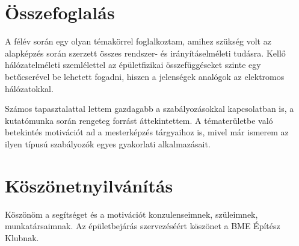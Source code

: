 \chapter{Összefoglalás}

A félév során egy olyan témakörrel foglalkoztam, amihez szükség volt az alapképzés során szerzett összes rendszer- és irányításelméleti tudásra. Kellő hálózatelméleti szemlélettel az épületfizikai összefüggéseket szinte egy betűcserével be lehetett fogadni, hiszen a jelenségek analógok az elektromos hálózatokkal.

Számos tapasztalattal lettem gazdagabb a szabályozásokkal kapcsolatban is, a kutatómunka során rengeteg forrást áttekintettem. A tématerületbe való betekintés motivációt ad a mesterképzés tárgyaihoz is, mivel már ismerem az ilyen típusú szabályozók egyes gyakorlati alkalmazásait.


\chapter*{Köszönetnyilvánítás}
Köszönöm a segítséget és a motivációt konzulenseimnek, szüleimnek, munkatársaimnak. Az épületbejárás szervezéséért köszönet a BME Építész Klubnak.
